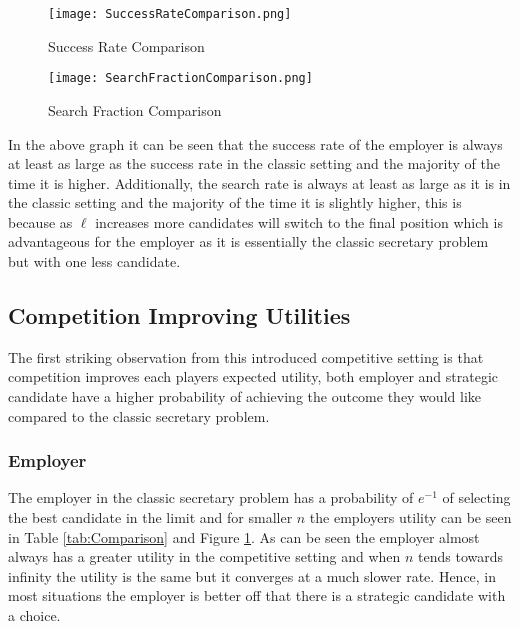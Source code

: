 \documentclass{article}
\begin{document}
\begin{table}[H]
\centering
\begin{minipage}{0.5\textwidth}
\small
\begin{figure}[H]
\centering
\centering
\texttt{[image: SuccessRateComparison.png]}
\caption{Success Rate Comparison}
\label{fig:SuccessRateComparison}
\end{figure}
\end{minipage}\hfill
\centering
\begin{minipage}{0.49\textwidth}
\small
\begin{figure}[H]
\centering
\centering
\texttt{[image: SearchFractionComparison.png]}
\caption{Search Fraction Comparison}
\label{fig:SearchFractionComparison}
\end{figure}
\end{minipage}\hfill
\end{table}

In the above graph it can be seen that the success rate of the employer is always at least as large as the success rate in the classic setting and the majority of the time it is higher. Additionally, the search rate is always at least as large as it is in the classic setting and the majority of the time it is slightly higher, this is because as $\ell$ increases more candidates will switch to the final position which is advantageous for the employer as it is essentially the classic secretary problem but with one less candidate.

\subsection{Competition Improving Utilities}

The first striking observation from this introduced competitive setting is that competition improves each players expected utility, both employer and strategic candidate have a higher probability of achieving the outcome they would like compared to the classic secretary problem.

\subsubsection{Employer}

The employer in the classic secretary problem has a probability of $e^{-1}$ of selecting the best candidate in the limit and for smaller $n$ the employers utility can be seen in Table \ref{tab:Comparison} and Figure \ref{fig:SuccessRateComparison}. As can be seen the employer almost always has a greater utility in the competitive setting and when $n$ tends towards infinity the utility is the same but it converges at a much slower rate. Hence, in most situations the employer is better off that there is a strategic candidate with a choice.
\end{document}
